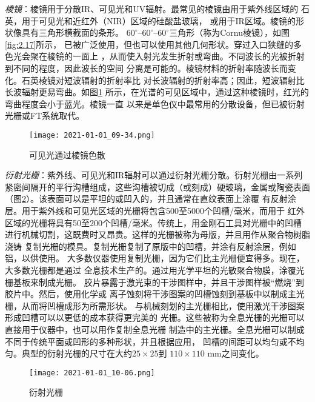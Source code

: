 \emph{棱镜}：棱镜用于分散IR、可见光和UV辐射。最常见的棱镜由用于紫外线区域的
石英，用于可见光和近红外（NIR）区域的硅酸盐玻璃，
或用于IR区域。棱镜的形状像具有三角形横截面的条形。
$60^\circ–60^\circ–60^\circ$三角形（称为Cornu棱镜），如图\ref{fig:2.17}所示，
已被广泛使用，但也可以使用其他几何形状。穿过入口狭缝的多色光会聚在棱镜的一面上
，从而使入射光发生折射或弯曲。不同波长的光被折射到不同的程度，因此波长的空间
分离是可能的。棱镜材料的折射率随波长而变化。石英棱镜对短波辐射的折射率比
对长波辐射的折射率高；因此，短波辐射比长波辐射更易弯曲。如图\ref{fig:2.18}
所示，在光谱的可见区域中，通过这种棱镜时，红光的弯曲程度会小于蓝光。棱镜一直
以来是单色仪中最常用的分散设备，但已被衍射光栅或FT系统取代。
\begin{figure}[htpb]
    \centering
    \texttt{[image: 2021-01-01\_09-34.png]}
    \caption{可见光通过棱镜色散}
    \label{fig:2.18}
\end{figure}

\emph{衍射光栅}：紫外线、可见光和IR辐射可以通过衍射光栅分散。衍射光栅由一系列
紧密间隔开的平行沟槽组成，这些沟槽被切成（或刻成）硬玻璃，金属或陶瓷表面
（图\ref{fig:2.19}）。该表面可以是平坦的或凹入的，并且通常在直纹表面上涂覆
有反射涂层。用于紫外线和可见光区域的光栅将包含500至5000个凹槽/毫米，而用于
红外区域的光栅将具有50至200个凹槽/毫米。传统上，用金刚石工具对光栅中的凹槽
进行机械切割，这既费时又昂贵。这样的光栅被称为母版，并且用作从聚合物树脂浇铸
复制光栅的模具。复制光栅复制了原版中的凹槽，并涂有反射涂层，例如铝，以供使用。
大多数仪器使用复制光栅，因为它们比主光栅便宜得多。现在，大多数光栅都是通过
全息技术生产的。通过用光学平坦的光敏聚合物膜，涂覆光栅基板来制成光栅。
胶片暴露于激光束的干涉图样中，并且干涉图样被“燃烧”到胶片中。然后，使用化学或
离子蚀刻将干涉图案的凹槽蚀刻到基板中以制成主光栅，从而将凹槽成形为所需形状。
与机械刻划的主光栅相比，使用激光干涉图案形成凹槽可以以更低的成本获得更完美的
光栅。这些被称为全息光栅的光栅可以直接用于仪器中，也可以用作复制全息光栅
制造中的主光栅。全息光栅可以制成不同于传统平面或凹形的多种形状，并且根据应用，
凹槽的间距可以均匀或不均匀。典型的衍射光栅的尺寸在大约$25\times 25$到
$110\times 110$ mm之间变化。
\begin{figure}[htpb]
    \centering
    \texttt{[image: 2021-01-01\_10-06.png]}
    \caption{衍射光栅}
    \label{fig:2.19}
\end{figure}

